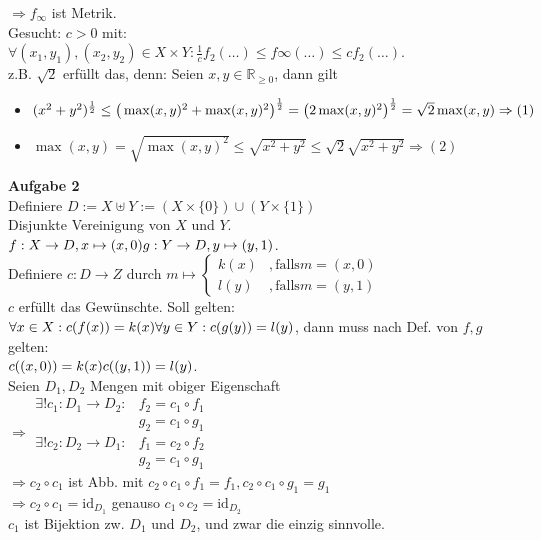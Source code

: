 \documentclass{article}
\begin{document}
$\Rightarrow f_\infty$ ist Metrik.\\
Gesucht: $c>0$ mit: $\forall(x_1,y_1),(x_2,y_2)\in X\times Y: \frac1cf_2(\ldots)\leq f\infty(\ldots)\leq cf_2(\ldots)$.\\
z.B. $\sqrt 2$ erfüllt das, denn: Seien $x,y \in\mathbb{R}_{\geq0}$, dann gilt\begin{itemize}
\item $(x^2+y^2)^\frac12 \leq \big(\max(x,y)^2+\max(x,y)^2\big)^\frac12 = \big(2\max(x,y)^2\big)^\frac12 = \sqrt 2\max(x,y)\\
\Rightarrow (1)$
\item $\max(x,y) = \sqrt{\max(x,y)^2} \leq \sqrt{x^2+y^2}\leq\sqrt2\sqrt{x^2+y^2}\Rightarrow (2)$
\end{itemize}

\textbf{Aufgabe 2}\\
Definiere $D:=X\uplus Y :=(X\times\{0\})\cup(Y\times\{1\})$\\
Disjunkte Vereinigung von $X$ und $Y$.\\
$f: X\rightarrow D, x\mapsto(x,0)\\
g: Y\rightarrow D,y\mapsto(y,1)$.\\
Definiere $c: D\rightarrow Z$ durch $m\mapsto\left\{\begin{array}{ll}k(x) & ,\text{falls} m=(x,0)\\ l(y) & ,\text{falls} m=(y,1)\end{array}\right.$\\
$c$ erfüllt das Gewünschte. Soll gelten:\\
$\forall x\in X: c(f(x)) = k(x)\\
\forall y\in Y: c(g(y)) = l(y)$, dann muss nach Def. von $f,g$ gelten:\\
$c((x,0)) = k(x)\\
c((y,1)) = l(y)$.\\
Seien $D_1,D_2$ Mengen mit obiger Eigenschaft\\
$\Rightarrow \begin{array}{llll}\exists ! c_1:D_1\rightarrow D_2 : & f_2 = c_1\circ f_1\\ & g_2 = c_1\circ g_1\\
\exists ! c_2 : D_2\rightarrow D_1 : & f_1 = c_2\circ f_2 \\ & g_2 = c_1\circ g_1\end{array}$\\
$\Rightarrow c_2\circ c_1$ ist Abb. mit $c_2\circ c_1\circ f_1 = f_1, c_2 \circ c_1\circ g_1 = g_1$\\
$\Rightarrow c_2\circ c_1 = \text{id}_{D_1}$ genauso $c_1\circ c_2 = \text{id}_{D_2}$\\
$c_1$ ist Bijektion zw. $D_1$ und $D_2$, und zwar die einzig sinnvolle.\\
\end{document}
